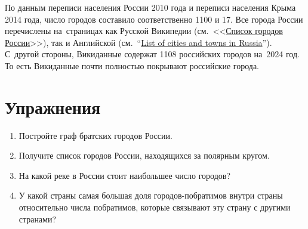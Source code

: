 По данным переписи населения России 2010 года %
и переписи населения Крыма 2014 года, число городов составило соответственно 1100 и 17. 
Все города России перечислены на~страницах 
как Русской Википедии 
    (см.~<<\href{https://ru.wikipedia.org/?curid=951219}{Список городов России}>>), 
так и Английской  
    (см.~``\href{https://en.wikipedia.org/?curid=171916}{List of cities and towns in Russia}'').
С~другой стороны, Викиданные содержат 1108 российских городов на~2024 год. То есть Викиданные почти полностью покрывают российские города. 

\section{Упражнения}

\begin{enumerate}
\item Постройте граф братских городов России.
\item Получите список городов России, находящихся за полярным кругом.
\item На какой реке в России стоит наибольшее число городов?
\item У какой страны самая большая доля городов-побратимов внутри страны 
    относительно числа \mbox{побратимов}, которые связывают эту страну с другими странами?
\end{enumerate}
